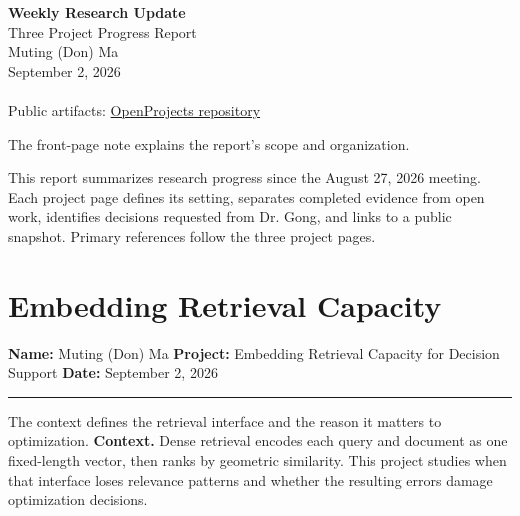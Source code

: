\documentclass[10pt]{article}
\newcommand{\projectline}[1]{%
  {\small\noindent\textbf{Name:} Muting (Don) Ma\hfill
    \textbf{Project:} #1\hfill
    \textbf{Date:} September 2, 2026\par}
  \vspace{0.18em}\hrule\vspace{0.42em}}
\begin{document}
\hypersetup{pageanchor=false}
\begin{titlepage}
\thispagestyle{empty}
\vspace*{0.18\textheight}
\begin{center}
  {\Huge\bfseries\textcolor{uablue}{Weekly Research Update}}\\[0.8em]
  {\Large Three Project Progress Report}\\[2.2em]
  {\large Muting (Don) Ma}\\[0.45em]
  {\large September 2, 2026}\\[3em]
  \\[3em]
  \small Public artifacts:
  \href{https://github.com/mutingma123/OpenProjects}{OpenProjects repository}

  \vspace{2.2em}
  \sumpara The front-page note explains the report's scope and organization. \sumparaend
  \parbox{0.78\textwidth}{\small\centering
    \fin This report summarizes research progress since the August 27, 2026 meeting. \fine
    \fin Each project page defines its setting, separates completed evidence from open work, identifies decisions requested from Dr. Gong, and links to a public snapshot. \fine
    \fin Primary references follow the three project pages. \fine}
\end{center}
\end{titlepage}
\hypersetup{pageanchor=true}

\clearpage
{}
\setcounter{page}{1}
\tableofcontents
\clearpage

\setcounter{page}{1}

\section{Embedding Retrieval Capacity}
\label{sec:retrieval}
\projectline{Embedding Retrieval Capacity for Decision Support}

\sumpara The context defines the retrieval interface and the reason it matters to optimization. \sumparaend
\noindent\textbf{Context.}
\fin Dense retrieval encodes each query and document as one fixed-length vector, then ranks by geometric similarity. \fine
\fin This project studies when that interface loses relevance patterns and whether the resulting errors damage optimization decisions. \fine
\end{document}
